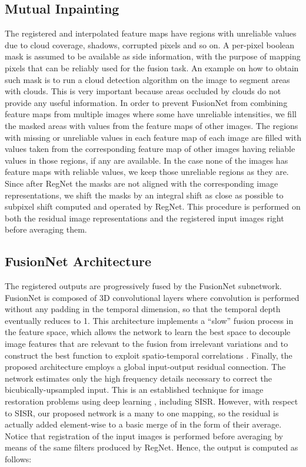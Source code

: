 \documentclass[journal]{IEEEtran}
\begin{document}
\subsection{Mutual Inpainting}
The registered and interpolated feature maps  have regions with unreliable values due to cloud coverage, shadows, corrupted pixels and so on. 
A per-pixel boolean mask is assumed to be available as side information, with the purpose of mapping pixels that can be reliably used for the fusion task. An example on how to obtain such mask is to run a cloud detection algorithm on the image to segment areas with clouds. This is very important because areas occluded by clouds do not provide any useful information.
In order to prevent FusionNet from combining feature maps from multiple images where some have unreliable intensities, we fill the masked areas with values from the feature maps of other images.
The regions with missing or unreliable values in each feature map of each image are filled with values taken from the corresponding feature map of other images having reliable values in those regions, if any are available. In the case none of the images has feature maps with reliable values, we keep those unreliable regions as they are.
Since after RegNet the masks are not aligned with the corresponding image representations, we shift the masks by an integral shift as close as possible to subpixel shift computed and operated by RegNet.
This procedure is performed on both the residual image representations  and the registered input images  right before averaging them.


\subsection{FusionNet Architecture}

The  registered outputs  are progressively fused by the FusionNet subnetwork. FusionNet is composed of  3D convolutional layers where convolution is performed without any padding in the temporal dimension, so that the temporal depth eventually reduces to 1. This architecture implements a ``slow'' fusion process in the feature space, which allows the network to learn the best space to decouple image features that are relevant to the fusion from irrelevant variations and to construct the best function to exploit spatio-temporal correlations \cite{DBLP:journals/corr/CaballeroLAATWS16}. 
Finally, the proposed architecture employs a global input-output residual connection. The network estimates only the high frequency details necessary to correct the bicubically-upsampled input. This is an established technique for image restoration problems using deep learning \cite{DnCnnZhang}, including SISR. However, with respect to SISR, our proposed network is a many to one mapping, so the residual is actually added element-wise to a basic merge of  in the form of their average. Notice that registration of the input images is performed before averaging by means of the same filters produced by RegNet. Hence, the output is computed as follows:
\end{document}
